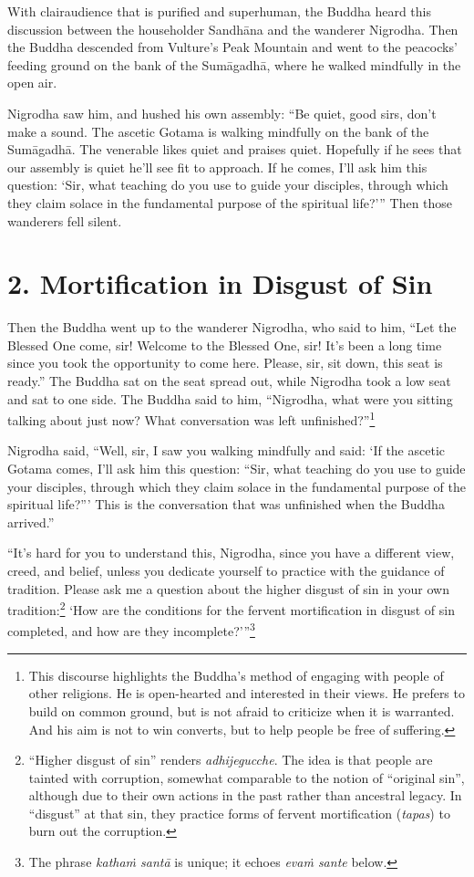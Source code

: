 \documentclass[12pt,openany]{book}%
\begin{document}
With clairaudience that is purified and superhuman, the Buddha heard this discussion between the householder \textsanskrit{Sandhāna} and the wanderer Nigrodha. Then the Buddha descended from Vulture’s Peak Mountain and went to the peacocks’ feeding ground on the bank of the \textsanskrit{Sumāgadhā}, where he walked mindfully in the open air. 

Nigrodha saw him, and hushed his own assembly: “Be quiet, good sirs, don’t make a sound. The ascetic Gotama is walking mindfully on the bank of the \textsanskrit{Sumāgadhā}. The venerable likes quiet and praises quiet. Hopefully if he sees that our assembly is quiet he’ll see fit to approach. If he comes, I’ll ask him this question: ‘Sir, what teaching do you use to guide your disciples, through which they claim solace in the fundamental purpose of the spiritual life?’” Then those wanderers fell silent. 

\section*{2. Mortification in Disgust of Sin }

Then the Buddha went up to the wanderer Nigrodha, who said to him, “Let the Blessed One come, sir! Welcome to the Blessed One, sir! It’s been a long time since you took the opportunity to come here. Please, sir, sit down, this seat is ready.” The Buddha sat on the seat spread out, while Nigrodha took a low seat and sat to one side. The Buddha said to him, “Nigrodha, what were you sitting talking about just now? What conversation was left unfinished?”\footnote{This discourse highlights the Buddha’s method of engaging with people of other religions. He is open-hearted and interested in their views. He prefers to build on common ground, but is not afraid to criticize when it is warranted. And his aim is not to win converts, but to help people be free of suffering. } 

Nigrodha said, “Well, sir, I saw you walking mindfully and said: ‘If the ascetic Gotama comes, I’ll ask him this question: “Sir, what teaching do you use to guide your disciples, through which they claim solace in the fundamental purpose of the spiritual life?”’ This is the conversation that was unfinished when the Buddha arrived.” 

“It’s hard for you to understand this, Nigrodha, since you have a different view, creed, and belief, unless you dedicate yourself to practice with the guidance of tradition. Please ask me a question about the higher disgust of sin in your own tradition:\footnote{“Higher disgust of sin” renders \textit{adhijegucche}. The idea is that people are tainted with corruption, somewhat comparable to the notion of “original sin”, although due to their own actions in the past rather than ancestral legacy. In “disgust” at that sin, they practice forms of fervent mortification (\textit{tapas}) to burn out the corruption. } ‘How are the conditions for the fervent mortification in disgust of sin completed, and how are they incomplete?’”\footnote{The phrase \textit{\textsanskrit{kathaṁ} \textsanskrit{santā}} is unique; it echoes \textit{\textsanskrit{evaṁ} sante} below. } 
\end{document}
